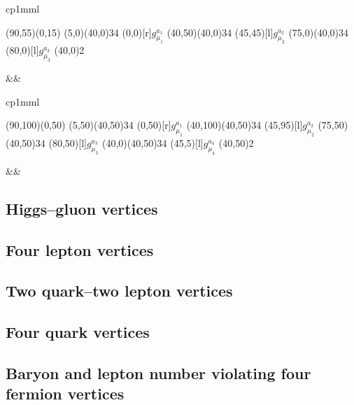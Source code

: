 \documentclass[11pt]{article}
\begin{document}
\noindent \begin{tabular}{cp{1mm}l}
\begin{picture}(90,55)(0,15)
\Gluon(5,0)(40,0){3}{4}
\Text(0,0)[r]{$g^{a_1}_{\mu_1}$}
\Gluon(40,50)(40,0){3}{4}
\Text(45,45)[l]{$g^{a_2}_{\mu_2}$}
\Gluon(75,0)(40,0){3}{4}
\Text(80,0)[l]{$g^{a_3}_{\mu_3}$}
\Vertex(40,0){2}
\end{picture}
&&
\begin{minipage}[c]{0.8\linewidth}

\end{minipage}
\end{tabular}

\bigskip

\noindent \begin{tabular}{cp{1mm}l}
\begin{picture}(90,100)(0,50)
\Gluon(5,50)(40,50){3}{4}
\Text(0,50)[r]{$g^{a_1}_{\mu_1}$}
\Gluon(40,100)(40,50){3}{4}
\Text(45,95)[l]{$g^{a_2}_{\mu_2}$}
\Gluon(75,50)(40,50){3}{4}
\Text(80,50)[l]{$g^{a_3}_{\mu_3}$}
\Gluon(40,0)(40,50){3}{4}
\Text(45,5)[l]{$g^{a_4}_{\mu_4}$}
\Vertex(40,50){2}
\end{picture}
&&
\begin{minipage}[c]{0.8\linewidth}

\end{minipage}
\end{tabular}

\bigskip

\bigskip
\bigskip
\subsection{Higgs--gluon vertices}

\bigskip
\bigskip
\subsection{Four
lepton vertices}

\bigskip
\bigskip
\subsection{Two quark--two lepton vertices}

\bigskip
\bigskip
\subsection{Four quark vertices}

\bigskip
\bigskip
\subsection{Baryon and lepton
number violating four fermion vertices}
\end{document}
